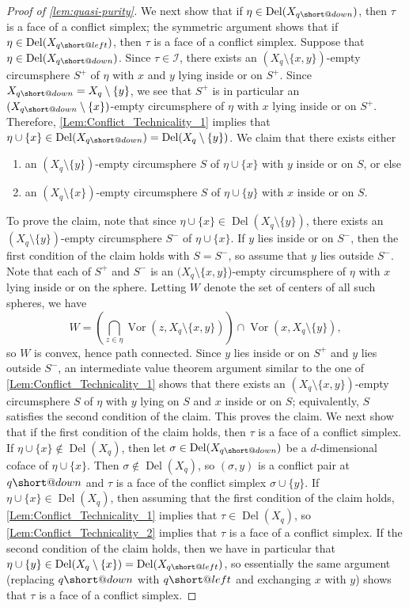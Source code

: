 \documentclass[11pt]{amsart}
\makeatletter
\DeclareMathOperator{\Vor}{Vor}
\DeclareMathOperator{\DelT}{Del}
\newcommand{\Incr}[0]{\mathcal{I}}
\DeclareRobustCommand{\subleft}{%
  \mathrel{\mathpalette\short@left\relax}%
}
\newcommand{\short@left}[2]{%
  \mkern2mu
  \clipbox{0 0 {.35\width} 0}{$\m@th#1\vphantom{+}{\leftarrow}$}%
  }
\DeclareRobustCommand{\subdown}{%
  \mathrel{\mathpalette\short@down\relax}%
}
\newcommand{\short@down}[2]{%
  \mkern2mu
  \clipbox{0 0 0 {.45\height}}{$\m@th#1\vphantom{+}{\downarrow}$}%
}
\theoremstyle{plain}
\theoremstyle{definition}
\theoremstyle{remark}
\makeatother
\begin{document}
\begin{proof}[Proof of \cref{lem:quasi-purity}]
%
We next show that if $\eta\in \DelT(X_{q{\subdown}})$, then $\tau$ is a face of a conflict simplex; the symmetric argument shows that if $\eta\in \DelT(X_{q{\subleft}})$, then $\tau$ is a face of a conflict simplex.  Suppose that $\eta\in \DelT(X_{q{\subdown}})$.  Since $\tau\in \Incr$, there exists an $(X_{q}\setminus \{x,y\})$-empty circumsphere $S^+$ of $\eta$ with $x$ and $y$ lying inside or on $S^+$.  Since $X_{q{\subdown}}= X_{q}\setminus \{y\}$, we see that $S^+$ is in particular an $(X_{q{\subdown}}\setminus \{x\})$-empty circumsphere of $\eta$ with $x$ lying inside or on $S^+$.  Therefore, \cref{Lem:Conflict_Technicality_1} implies that $\eta\cup\{x\}\in \DelT(X_{q{\subdown}})=\DelT(X_{q}\setminus \{y\})$.
%
We claim that there exists either 
\begin{enumerate}
\item an $(X_q\setminus \{y\})$-empty circumsphere $S$ of $\eta\cup\{x\}$ with $y$ inside or on $S$, or else 
\item an $(X_q\setminus \{x\})$-empty circumsphere $S$ of $\eta\cup\{y\}$ with $x$ inside or on $S$.
\end{enumerate}
%
To prove the claim, note that since $\eta\cup\{x\} \in \DelT(X_{q}\setminus \{y\})$, there exists an $(X_q\setminus \{y\})$-empty circumsphere $S^-$ of $\eta\cup\{x\}$.   If $y$ lies inside or on $S^-$, then the first condition of the claim holds with $S=S^-$, so assume that $y$ lies outside $S^-$.  Note that each of $S^+$ and $S^-$ is an $(X_q\setminus \{x,y\}$)-empty circumsphere of $\eta$ with $x$ lying inside or on the sphere.  Letting $W$ denote the set of centers of all such spheres, we have \[W=\left(\bigcap_{z\in \eta} \Vor(z, X_q\setminus \{x,y\})\right) \cap \Vor(x,X_q\setminus \{y\}),\] so $W$ is convex, hence path connected.    Since $y$ lies inside or on $S^+$ and $y$ lies outside $S^-$, an intermediate value theorem argument similar to the one of \cref{Lem:Conflict_Technicality_1} shows that there exists an $(X_q\setminus \{x,y\})$-empty circumsphere $S$ of $\eta$ with $y$ lying on $S$ and $x$ inside or on $S$; equivalently, $S$ satisfies the second condition of the claim.  This proves the claim.  
%
We next show that if the first condition of the claim holds, then $\tau$ is a face of a conflict simplex.  If $\eta\cup\{x\}\not \in \DelT(X_{q})$, then let  $\sigma\in \DelT(X_{q{\subdown}})$ be a $d$-dimensional coface of $\eta\cup\{x\}$.  Then $\sigma\not\in \DelT(X_{q})$, so $(\sigma,y)$ is a conflict pair at $q{\subdown}$ and  $\tau$ is a face of the conflict simplex $\sigma\cup \{y\}$.  If $\eta\cup\{x\}\in \DelT(X_{q})$, then assuming that the first condition of the claim holds, \cref{Lem:Conflict_Technicality_1} implies that $\tau\in \DelT(X_q)$, so \cref{Lem:Conflict_Technicality_2} implies that $\tau$ is a face of a conflict simplex.
%
If the second condition of the claim holds, then we have in particular that $\eta\cup\{y\}\in  \DelT(X_{q}\setminus \{x\})=\DelT(X_{q{\subleft}})$, so essentially the same argument (replacing $q{\subdown}$ with $q{\subleft}$ and exchanging $x$ with $y$) shows that $\tau$ is a face of a conflict simplex.
\end{proof}
\end{document}
